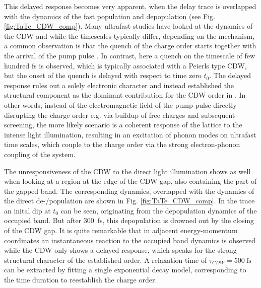 This delayed response becomes very apparent, when the delay trace is overlapped with the dynamics of the fast population and depopulation (see Fig. \ref{fig:TaTe_CDW_comp}).
Many ultrafast studies have looked at the dynamics of the CDW and while the timescales typically differ, depending on the mechanism, a common observation is that the quench of the charge order starts together with the arrival of the pump pulse \cite{perfetti_time_2006, rohwer_collapse_2011, rettig_coherent_2014, shi_ultrafast_2019, maklar_nonequilibrium_2021, maklar_coherent_2022, huber_mapping_2022, huber_revealing_2022, maklar_coherent_2023, huber_ultrafast_2024}.
In contrast, here a quench on the timescale of few hundred \unit{\femto\second} is observed, which is typically associated with a Peierls type CDW, but the onset of the quench is delayed with respect to time zero $t_0$.
The delayed response rules out a solely electronic character and instead established the structural component as the dominant contribution for the CDW order in .
In other words, instead of the electromagnetic field of the pump pulse directly disrupting the charge order e.g. via buildup of free charges and subsequent screening, the more likely scenario is a coherent response of the lattice to the intense light illumination, resulting in an excitation of phonon modes on ultrafast time scales, which couple to the charge order via the strong electron-phonon coupling of the system.

The unresponsiveness of the CDW to the direct light illumination shows as well when looking at a region at the edge of the CDW gap, also containing the part of the gapped band.
The corresponding dynamics, overlapped with the dynamics of the direct de-/population are shown in Fig. \ref{fig:TaTe_CDW_comp}.
In the trace an inital dip at $t_0$ can be seen, originating from the depopulation dynamics of the occupied band.
But after \qty{300}{\femto\second}, this depopulation is drowned out by the closing of the CDW gap.
It is quite remarkable that in adjacent energy-momentum coordinates an instantaneous reaction to the occupied band dynamics is observed while the CDW only shows a delayed response, which speaks for the strong structural character of the established order.
A relaxation time of $\tau_{CDW}=\qty{500}{\femto\second}$ can be extracted by fitting a single exponential decay model, corresponding to the time duration to reestablish the charge order.

